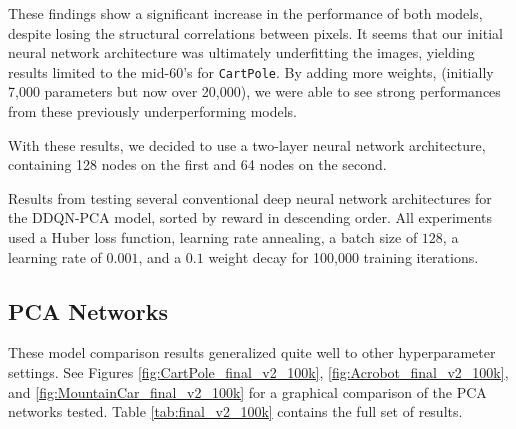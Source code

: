 \documentclass[11pt]{article}
\newcommand{\cp}{\texttt{CartPole}}
\begin{document}
These findings show a significant increase in the performance of both models, despite losing the structural correlations between pixels. It seems that our initial neural network architecture was ultimately underfitting the images, yielding results limited to the mid-60's for \cp. By adding more weights, (initially 7,000 parameters but now over 20,000), we were able to see strong performances from these previously underperforming models.

With these results, we decided to use a two-layer neural network architecture, containing 128 nodes on the first and 64 nodes on the second.

\begin{table}[!ht]
    \footnotesize
    \centering
    
    
    \caption{Results from testing several conventional deep neural network architectures for the DDQN-PCA model, sorted by reward in descending order. All experiments used a Huber loss function, learning rate annealing, a batch size of $128$, a learning rate of $0.001$, and a $0.1$ weight decay for 100,000 training iterations.}
    \label{tab:model_selection_DDQN_PCA_5}
\end{table}

\subsection{PCA Networks}

These model comparison results generalized quite well to other hyperparameter settings. See Figures \ref{fig:CartPole_final_v2_100k}, \ref{fig:Acrobot_final_v2_100k}, and \ref{fig:MountainCar_final_v2_100k} for a graphical comparison of the PCA networks tested. Table \ref{tab:final_v2_100k} contains the full set of results. 
\end{document}

